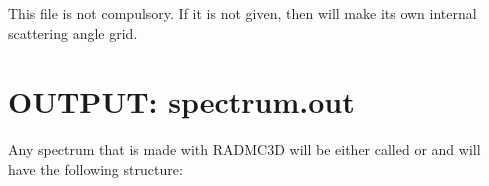 \documentclass[letterpaper,10pt,english]{sphinxmanual}
\begin{document}
\begin{sphinxVerbatim}[commandchars=\\\{\}]
                 
               
                 
               
\end{sphinxVerbatim}

 This file is not compulsory. If it is not given, then
 will make its own internal scattering angle grid.


\section{OUTPUT: spectrum.out}
\label{\detokenize{inputoutputfiles:output-spectrum-out}}\label{\detokenize{inputoutputfiles:sec-output-spectrum-out}}
Any spectrum that is made with RADMC\sphinxhyphen{}3D will be either called
 or  and will have
the following structure:

\begin{sphinxVerbatim}[commandchars=\\\{\}]
                           

\PYG{p}{[}\PYG{p}{]}       \PYG{p}{[}\PYG{p}{]}
                 
                 
\PYG{p}{[}\PYG{p}{]}   \PYG{p}{[}\PYG{p}{]}
\end{sphinxVerbatim}
\end{document}

